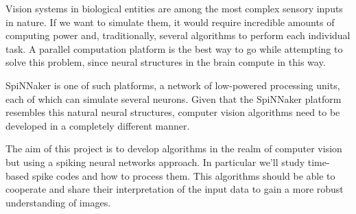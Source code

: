 Vision systems in biological entities are among the most complex sensory
inputs in nature. If we want to simulate them, it would require incredible
amounts of computing power and, traditionally, several algorithms to perform
each individual task. A parallel computation platform is the best way to go
while attempting to solve this problem, since neural structures in the brain 
compute in this way. 

SpiNNaker is one of such platforms, a network of low-powered processing units,
each of which can simulate several neurons. Given that the SpiNNaker platform
resembles this natural neural structures, computer vision algorithms need to be
developed in a completely different manner.

The aim of this project is to develop algorithms in the realm of computer vision
but using a spiking neural networks approach. In particular we'll study 
time-based spike codes and how to process them. This algorithms should be 
able to cooperate and share their interpretation of the input data to gain a
more robust understanding of images.
